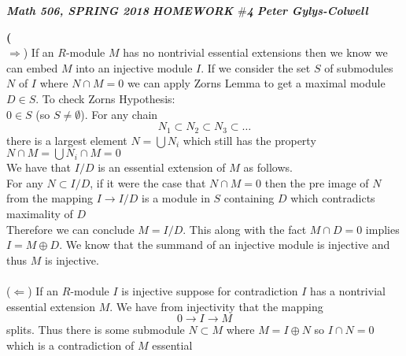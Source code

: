 \documentclass[12pt]{article}
\newenvironment{ques}[1]{\textbf{#1}\vspace{1 mm}\\ }{\bigskip}
\theoremstyle{definition}
\begin{document}
\noindent \textit{\textbf{Math 506, SPRING 2018}} \hspace{1.3cm}
\textit{\textbf{HOMEWORK $\#$4}} \hspace{1.3cm} \textit{\textbf{Peter
Gylys-Colwell}} 

\vspace{1cm}

\begin{ques}{1}
	($\Rightarrow$) If an $R$-module $M$ has no nontrivial essential extensions
	then we know we can embed $M$ into an injective module $I$. If we consider
	the set $S$ of submodules $N$ of $I$ where $N \cap M = 0$ we can apply
	Zorns Lemma to get a maximal module $D \in S$. To check Zorns Hypothesis:\\
	$0 \in S$ (so $S \neq \emptyset$). For any chain
	$$N_1 \subset N_2 \subset N_3 \subset \dots $$
	there is a largest element $N = \bigcup N_i$ which still has the property
	$N \cap M = \bigcup N_i \cap M = 0$\\
	We have that $I/D$ is an essential extension of $M$ as follows.\\
	For any $N \subset I/D$, if it were the case that $N \cap M = 0$ then the
	pre image of $N$ from the mapping $I \to I/D$ is a module in $S$ containing
	$D$ which contradicts maximality of $D$\\
	Therefore we can conclude $M = I/D$.  This along with the fact $M \cap D =
	0$ implies $I = M \oplus D$. We know that the summand of an injective
	module is injective and thus $M$ is injective.
	\\
	\\
	($\Leftarrow$) If an $R$-module $I$ is injective suppose for contradiction
	$I$ has a nontrivial essential extension $M$. We have from injectivity that
	the mapping
	$$0 \to I \to M$$
	splits. Thus there is some submodule $N \subset M$ where $M = I \oplus N$ so
	$I \cap N = 0$ which is a contradiction of $M$ essential
\end{ques}
\end{document}

